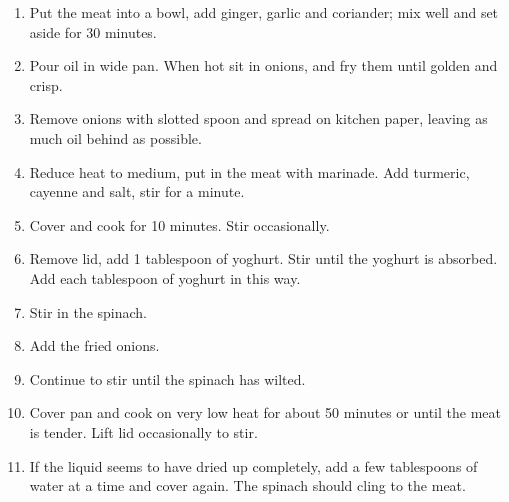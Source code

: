 \documentclass[11pt,a4paper]{article}
\begin{document}
\begin{enumerate}
  \item Put the meat into a bowl, add ginger, garlic and coriander; mix well and set aside for 30 minutes.
  \item Pour oil in wide pan. When hot sit in onions, and fry them until golden and crisp.
  \item Remove onions with slotted spoon and spread on kitchen paper, leaving as much oil behind as possible.
  \item Reduce heat to medium, put in the meat with marinade. Add turmeric, cayenne and salt, stir for a minute.
  \item Cover and cook for 10 minutes. Stir occasionally.
  \item Remove lid, add 1 tablespoon of yoghurt. Stir until the yoghurt is absorbed. Add each tablespoon of yoghurt in this way.
  \item Stir in the spinach.
  \item Add the fried onions.
  \item Continue to stir until the spinach has wilted.
  \item Cover pan and cook on very low heat for about 50 minutes or until the meat is tender. Lift lid occasionally to stir.
  \item If the liquid seems to have dried up completely, add a few tablespoons of water at a time and cover again. The spinach should cling to the meat.

\end{enumerate}
\end{document}
